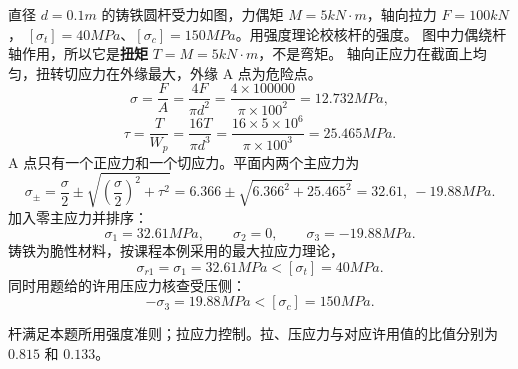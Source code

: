 \documentclass[a4paper,10pt,fontset=none]{ctexart}
\begin{document}
直径 $d=0.1\unit{m}$ 的铸铁圆杆受力如图，力偶矩 $M=5\unit{kN\cdot m}$，轴向拉力 $F=100\unit{kN}$，
$[\sigma_t]=40\unit{MPa}$、$[\sigma_c]=150\unit{MPa}$。用强度理论校核杆的强度。
图中力偶绕杆轴作用，所以它是\textbf{扭矩} $T=M=5\unit{kN\cdot m}$，不是弯矩。
轴向正应力在截面上均匀，扭转切应力在外缘最大，外缘 A 点为危险点。
\[
\sigma=\frac{F}{A}=\frac{4F}{\pi d^2}
=\frac{4\times100000}{\pi\times100^2}=12.732\unit{MPa},
\]
\[
\tau=\frac{T}{W_p}=\frac{16T}{\pi d^3}
=\frac{16\times5\times10^6}{\pi\times100^3}=25.465\unit{MPa}.
\]
A 点只有一个正应力和一个切应力。平面内两个主应力为
\[
\sigma_\pm=\frac\sigma2\pm\sqrt{\left(\frac\sigma2\right)^2+\tau^2}
=6.366\pm\sqrt{6.366^2+25.465^2}
=32.61,\ -19.88\unit{MPa}.
\]
加入零主应力并排序：
\[
\sigma_1=32.61\unit{MPa},\qquad \sigma_2=0,\qquad \sigma_3=-19.88\unit{MPa}.
\]
铸铁为脆性材料，按课程本例采用的最大拉应力理论，
\[
\sigma_{r1}=\sigma_1=32.61\unit{MPa}<[\sigma_t]=40\unit{MPa}.
\]
同时用题给的许用压应力核查受压侧：
\[
-\sigma_3=19.88\unit{MPa}<[\sigma_c]=150\unit{MPa}.
\]
\begin{answerbox}
杆满足本题所用强度准则；拉应力控制。拉、压应力与对应许用值的比值分别为 $0.815$ 和 $0.133$。
\end{answerbox}
\end{document}
